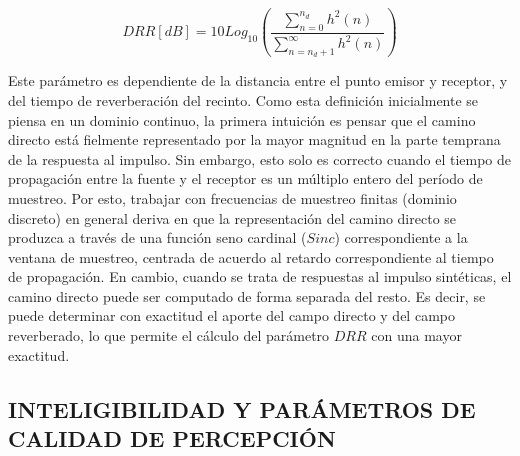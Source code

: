 \begin{equation}
\label{eqn:DRR}
	DRR  [dB]= 10 Log_{10}(\frac{\sum_{n=0}^{n_d}h^{2}(n)}{\sum_{n=n_{d}+1}^{\infty}h^{2}(n)}) 
\end{equation}

Este parámetro es dependiente de la distancia entre el punto emisor y receptor, y del tiempo de reverberación del recinto. Como esta definición inicialmente se piensa en un dominio continuo, la primera intuición es pensar que el camino directo está fielmente representado por la mayor magnitud en la parte temprana de la respuesta al impulso. Sin embargo, esto solo es correcto cuando el tiempo de propagación entre la fuente y el receptor es un múltiplo entero del período de muestreo. Por esto, trabajar con frecuencias de muestreo finitas (dominio discreto) en general deriva en que la representación del camino directo se produzca a través de una función seno cardinal ($Sinc$) correspondiente a la ventana de muestreo, centrada de acuerdo al retardo correspondiente al tiempo de propagación. En cambio, cuando se trata de respuestas al impulso sintéticas, el camino directo puede ser computado de forma separada del resto. Es decir, se puede determinar con exactitud el aporte del campo directo y del campo reverberado, lo que permite el cálculo del parámetro $DRR$ con una mayor exactitud. 




\subsection[Inteligibilidad y parámetros de calidad de percepción]{INTELIGIBILIDAD Y PARÁMETROS DE CALIDAD DE PERCEPCIÓN}

